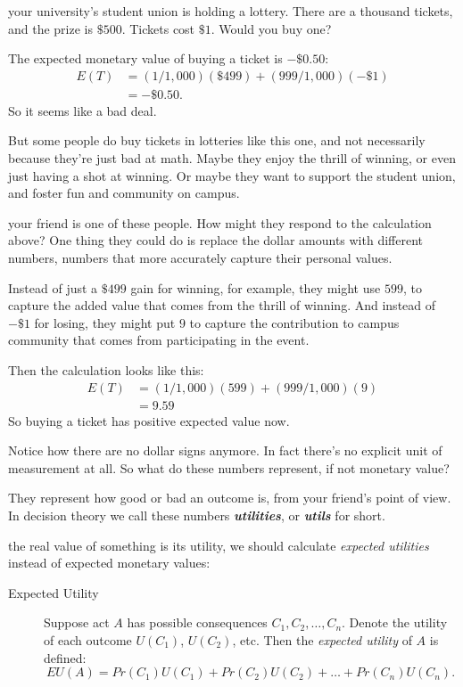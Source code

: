 \documentclass[justified]{tufte-book}
\renewcommand{\u}{U}
\newcommand{\p}{Pr}
\newcommand{\E}{E}
\newcommand{\EU}{EU}
\theoremstyle{definition}
\theoremstyle{definition}
\theoremstyle{definition}
\theoremstyle{remark}
\begin{document}
 your university's student union is holding a lottery. There are a thousand tickets, and the prize is \(\$500\). Tickets cost \(\$1\). Would you buy one?

The expected monetary value of buying a ticket is \(-\$0.50\):
\[
  \begin{aligned}
    \E(T) &= (1/1,000)(\$499) + (999/1,000)(-\$1)\\
          &= -\$0.50.
  \end{aligned}
\]
So it seems like a bad deal.

But some people do buy tickets in lotteries like this one, and not necessarily because they're just bad at math. Maybe they enjoy the thrill of winning, or even just having a shot at winning. Or maybe they want to support the student union, and foster fun and community on campus.

 your friend is one of these people. How might they respond to the calculation above? One thing they could do is replace the dollar amounts with different numbers, numbers that more accurately capture their personal values.

Instead of just a \(\$499\) gain for winning, for example, they might use \(599\), to capture the added value that comes from the thrill of winning. And instead of \(-\$1\) for losing, they might put \(9\) to capture the contribution to campus community that comes from participating in the event.

Then the calculation looks like this:
\[
  \begin{aligned}
    \E(T) &= (1/1,000)(599) + (999/1,000)(9)\\
          &= 9.59
  \end{aligned}
\]
So buying a ticket has positive expected value now.

Notice how there are no dollar signs anymore. In fact there's no explicit unit of measurement at all. So what do these numbers represent, if not monetary value?

They represent how good or bad an outcome is, from your friend's point of view. In decision theory we call these numbers \textbf{\emph{utilities}}, or \textbf{\emph{utils}} for short.

 the real value of something is its utility, we should calculate \emph{expected utilities} instead of expected monetary values:

\begin{description}
\item[Expected Utility]
Suppose act \(A\) has possible consequences \(C_1, C_2, \ldots,C_n\). Denote the utility of each outcome \(U(C_1)\), \(U(C_2)\), etc. Then the \emph{expected utility} of \(A\) is defined:
\[ \EU(A) = \p(C_1)\u(C_1) + \p(C_2)\u(C_2) + \ldots + \p(C_n)\u(C_n). \]
\end{description}
\end{document}
